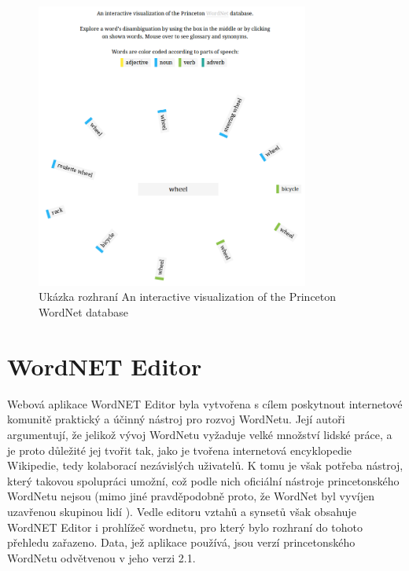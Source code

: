 \documentclass[a4paper, 11pt, oneside]{book}
\begin{document}
				\begin{figure}[h]
					\centering
					\includegraphics[width=0.8\textwidth]{intviswn.png}
					\caption{Ukázka rozhraní An interactive visualization of the Princeton WordNet database}
					\label{fig:intviswn}
				\end{figure}

			\section{WordNET Editor}
			\label{wnvis:wncoledit}

				Webová aplikace WordNET Editor byla vytvořena s cílem poskytnout internetové komunitě praktický a účinný nástroj pro rozvoj WordNetu. Její autoři argumentují, že jelikož vývoj WordNetu vyžaduje velké množství lidské práce, a je proto důležité jej tvořit tak, jako je tvořena internetová encyklopedie Wikipedie, tedy kolaborací nezávislých uživatelů. \parencite{szymanski2007cooperative} K tomu je však potřeba nástroj, který takovou spolupráci umožní, což podle nich oficiální nástroje princetonského WordNetu nejsou (mimo jiné pravděpodobně proto, že WordNet byl vyvíjen uzavřenou skupinou lidí \parencite{fellbaum2005wordnets}). Vedle editoru vztahů a synsetů však obsahuje WordNET Editor i prohlížeč wordnetu, pro který bylo rozhraní do tohoto přehledu zařazeno. Data, jež aplikace používá, jsou verzí princetonského WordNetu odvětvenou v jeho verzi 2.1. \parencite{szymanski2007cooperative}
\end{document}
